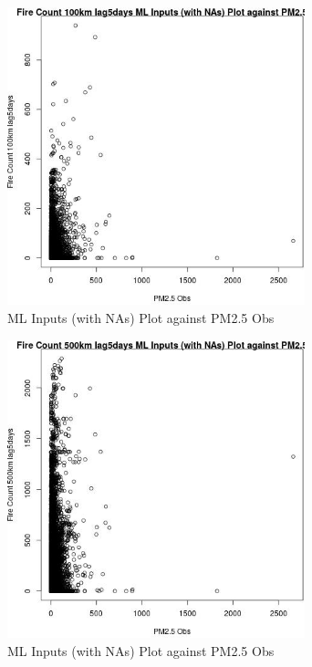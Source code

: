 \begin{figure} 
\centering  
\includegraphics[width=0.77\textwidth]{Code_Outputs/Report_ML_input_PM25_Step4_part_e_de_duplicated_aves_compiled_2019-05-20wNAs_Fire_Count_100km_lag5daysvPM25_Obs.jpg} 
\caption{\label{fig:Report_ML_input_PM25_Step4_part_e_de_duplicated_aves_compiled_2019-05-20wNAsFire_Count_100km_lag5daysvPM25_Obs}ML Inputs (with NAs) Plot against PM2.5 Obs} 
\end{figure} 
 

\begin{figure} 
\centering  
\includegraphics[width=0.77\textwidth]{Code_Outputs/Report_ML_input_PM25_Step4_part_e_de_duplicated_aves_compiled_2019-05-20wNAs_Fire_Count_500km_lag5daysvPM25_Obs.jpg} 
\caption{\label{fig:Report_ML_input_PM25_Step4_part_e_de_duplicated_aves_compiled_2019-05-20wNAsFire_Count_500km_lag5daysvPM25_Obs}ML Inputs (with NAs) Plot against PM2.5 Obs} 
\end{figure} 
 

